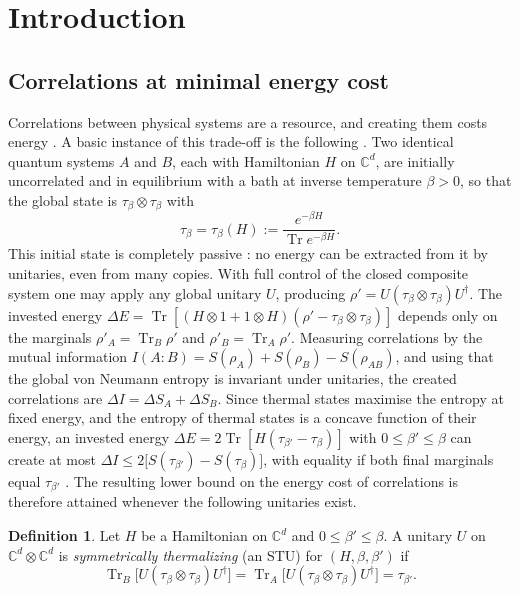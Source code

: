 \documentclass[11pt]{amsart}
\theoremstyle{definition}
\newtheorem{definition}[lemma]{Definition}
\theoremstyle{remark}
\numberwithin{equation}{section}
\newcommand{\C}{\mathbb{C}}
\newcommand{\Tr}{\operatorname{Tr}}
\begin{document}
\section{Introduction}\label{sec:intro}

\subsection{Correlations at minimal energy cost}
Correlations between physical systems are a resource, and creating them costs energy
\cite{HuberEtAl2015,BruschiEtAl2015,VitaglianoEtAl2019}. A basic instance of this trade-off is the
following \cite{BakhshinezhadEtAl2019}. Two identical quantum systems $A$ and $B$, each with
Hamiltonian $H$ on $\C^d$, are initially uncorrelated and in equilibrium with a bath at inverse
temperature $\beta>0$, so that the global state is $\tau_\beta\otimes\tau_\beta$ with
\[
  \tau_\beta=\tau_\beta(H):=\frac{e^{-\beta H}}{\Tr e^{-\beta H}} .
\]
This initial state is completely passive \cite{PuszWoronowicz1978}: no energy can be extracted from it
by unitaries, even from many copies.
With full control of the closed composite system one may apply any global unitary $U$, producing
$\rho'=U(\tau_\beta\otimes\tau_\beta)U^\dagger$. The invested energy
$\Delta E=\Tr[(H\otimes 1+1\otimes H)(\rho'-\tau_\beta\otimes\tau_\beta)]$ depends only on the
marginals $\rho'_A=\Tr_B\rho'$ and $\rho'_B=\Tr_A\rho'$. Measuring correlations by the mutual
information $I(A{:}B)=S(\rho_A)+S(\rho_B)-S(\rho_{AB})$, and using that the global von Neumann
entropy is invariant under unitaries, the created correlations are $\Delta I=\Delta S_A+\Delta S_B$.
Since thermal states maximise the entropy at fixed energy, and the entropy of thermal states is a
concave function of their energy, an invested energy $\Delta E=2\Tr[H(\tau_{\beta'}-\tau_\beta)]$ with
$0\le\beta'\le\beta$ can create at most $\Delta I\le2\bigl[S(\tau_{\beta'})-S(\tau_\beta)\bigr]$, with
equality if both final marginals equal $\tau_{\beta'}$ \cite[Sec.~II and App.~A.I]{BakhshinezhadEtAl2019}.
The resulting lower bound on the energy cost of correlations is therefore attained whenever the
following unitaries exist.

\begin{definition}\label{def:stu}
Let $H$ be a Hamiltonian on $\C^d$ and $0\le\beta'\le\beta$. A unitary $U$ on $\C^d\otimes\C^d$ is
\emph{symmetrically thermalizing} (an STU) for $(H,\beta,\beta')$ if
\[
  \Tr_B\bigl[U(\tau_\beta\otimes\tau_\beta)U^\dagger\bigr]
  =\Tr_A\bigl[U(\tau_\beta\otimes\tau_\beta)U^\dagger\bigr]=\tau_{\beta'} .
\]
\end{definition}
\end{document}
